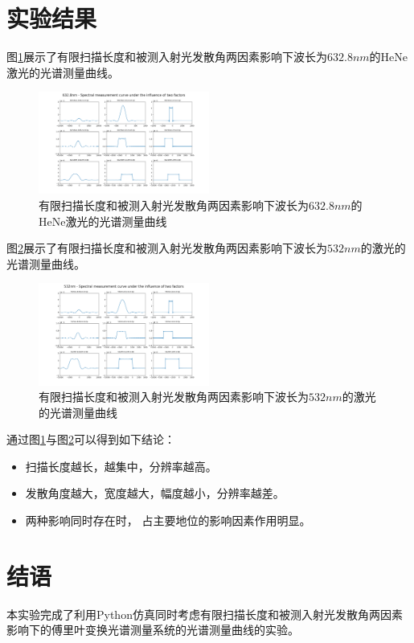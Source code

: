 \documentclass[conference]{IEEEtran}
\begin{document}
\section{实验结果}
图\ref{pic5}展示了有限扫描长度和被测入射光发散角两因素影响下波长为$632.8nm$的HeNe激光的光谱测量曲线。
\begin{figure}[htbp]
    \centerline{\includegraphics[width=0.5\textwidth]{pic5.png}}
    \caption{有限扫描长度和被测入射光发散角两因素影响下波长为$632.8nm$的HeNe激光的光谱测量曲线}
    \label{pic5}
\end{figure}
图\ref{pic6}展示了有限扫描长度和被测入射光发散角两因素影响下波长为$532nm$的激光的光谱测量曲线。
\begin{figure}[htbp]
    \centerline{\includegraphics[width=0.5\textwidth]{pic6.png}}
    \caption{有限扫描长度和被测入射光发散角两因素影响下波长为$532nm$的激光的光谱测量曲线}
    \label{pic6}
\end{figure}
通过图\ref{pic5}与图\ref{pic6}可以得到如下结论：
\begin{itemize}
    \item 扫描长度越长，越集中，分辨率越高。
    \item 发散角度越大，宽度越大，幅度越小，分辨率越差。
    \item 两种影响同时存在时， 占主要地位的影响因素作用明显。
\end{itemize}

\section{结语}
本实验完成了利用Python仿真同时考虑有限扫描长度和被测入射光发散角两因素影响下的傅里叶变换光谱测量系统的光谱测量曲线的实验。
\end{document}
